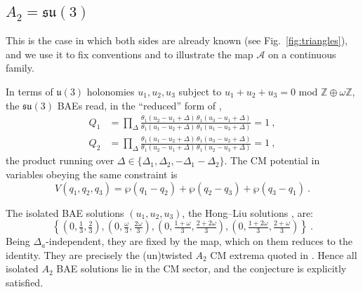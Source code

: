 \documentclass[aps, prx, nofootinbib, twocolumn,amsfonts,amsmath,amssymb,mathtools,superscriptaddress,preprintnumbers,floatfix,reprint]{revtex4-2}
\begin{document}
\subsection{\texorpdfstring{$A_2=\mathfrak{su}(3)$}{A2=su(3)}}
\label{sub:A2}

This is the case in which both sides are already known (see Fig.~\ref{fig:triangles}), and we use it to fix
conventions and to illustrate the map $\mathcal{A}$ on a continuous family.

In terms of $\mathfrak{u}(3)$ holonomies $u_1,u_2,u_3$ subject to
$u_1+u_2+u_3=0$ mod $\mathbb{Z}\oplus\omega\mathbb{Z}$, the $\mathfrak{su}(3)$
BAEs read, in the ``reduced'' form of \cite{Benini:2021ano},
\begin{align}
  Q_1&=\prod_{\Delta}\frac{\theta_1(u_2-u_1+\Delta)\,\theta_1(u_3-u_1+\Delta)}
  {\theta_1(u_1-u_2+\Delta)\,\theta_1(u_1-u_3+\Delta)}=1\ ,\\
  Q_2&=\prod_{\Delta}\frac{\theta_1(u_1-u_2+\Delta)\,\theta_1(u_3-u_2+\Delta)}
  {\theta_1(u_2-u_1+\Delta)\,\theta_1(u_2-u_3+\Delta)}=1\ ,
\end{align}
the product running over
$\Delta\in\{\Delta_1,\Delta_2,-\Delta_1-\Delta_2\}$. The CM potential in
variables obeying the same constraint is
\begin{equation}\label{eq:A2pot}
  V(q_1,q_2,q_3)=\wp(q_1-q_2)+\wp(q_2-q_3)+\wp(q_3-q_1)\ .
\end{equation}

The isolated BAE solutions $(u_1,u_2,u_3)$, the Hong--Liu solutions \cite{Hong:2018viz}, are:
\begin{equation}
\label{eq:A2HL}
  \left\{\left(0,\tfrac13,\tfrac23\right),
  \left(0,\tfrac{\omega}{3},\tfrac{2\omega}{3}\right),
  \left(0,\tfrac{1+\omega}{3},\tfrac{2+2\omega}{3}\right),
  \left(0,\tfrac{1+2\omega}{3},\tfrac{2+\omega}{3}\right)\right\}\ .
\end{equation}
Being $\Delta_a$-independent, they are fixed by the map, which on them
reduces to the identity. They are precisely the (un)twisted $A_2$ CM extrema
quoted in \cite{Bourget:2015upj}. Hence all isolated $A_2$ BAE solutions lie in
the CM sector, and the conjecture is explicitly satisfied.
\end{document}
